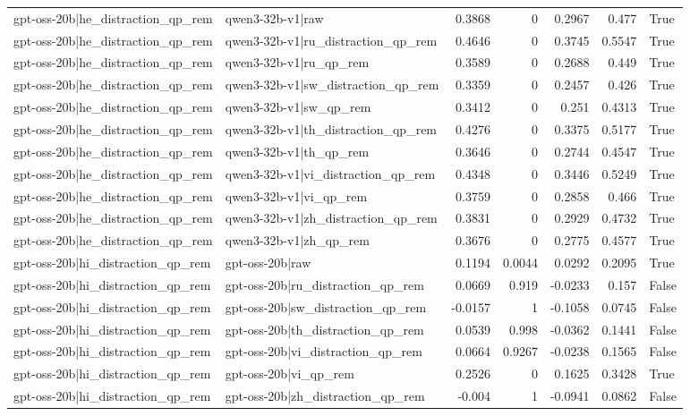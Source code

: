 \begin{table}
\begin{tabular}{l l r r r r l}
gpt-oss-20b|he_distraction_qp_rem & qwen3-32b-v1|raw & 0.3868 & 0 & 0.2967 & 0.477 & True \\
gpt-oss-20b|he_distraction_qp_rem & qwen3-32b-v1|ru_distraction_qp_rem & 0.4646 & 0 & 0.3745 & 0.5547 & True \\
gpt-oss-20b|he_distraction_qp_rem & qwen3-32b-v1|ru_qp_rem & 0.3589 & 0 & 0.2688 & 0.449 & True \\
gpt-oss-20b|he_distraction_qp_rem & qwen3-32b-v1|sw_distraction_qp_rem & 0.3359 & 0 & 0.2457 & 0.426 & True \\
gpt-oss-20b|he_distraction_qp_rem & qwen3-32b-v1|sw_qp_rem & 0.3412 & 0 & 0.251 & 0.4313 & True \\
gpt-oss-20b|he_distraction_qp_rem & qwen3-32b-v1|th_distraction_qp_rem & 0.4276 & 0 & 0.3375 & 0.5177 & True \\
gpt-oss-20b|he_distraction_qp_rem & qwen3-32b-v1|th_qp_rem & 0.3646 & 0 & 0.2744 & 0.4547 & True \\
gpt-oss-20b|he_distraction_qp_rem & qwen3-32b-v1|vi_distraction_qp_rem & 0.4348 & 0 & 0.3446 & 0.5249 & True \\
gpt-oss-20b|he_distraction_qp_rem & qwen3-32b-v1|vi_qp_rem & 0.3759 & 0 & 0.2858 & 0.466 & True \\
gpt-oss-20b|he_distraction_qp_rem & qwen3-32b-v1|zh_distraction_qp_rem & 0.3831 & 0 & 0.2929 & 0.4732 & True \\
gpt-oss-20b|he_distraction_qp_rem & qwen3-32b-v1|zh_qp_rem & 0.3676 & 0 & 0.2775 & 0.4577 & True \\
gpt-oss-20b|hi_distraction_qp_rem & gpt-oss-20b|raw & 0.1194 & 0.0044 & 0.0292 & 0.2095 & True \\
gpt-oss-20b|hi_distraction_qp_rem & gpt-oss-20b|ru_distraction_qp_rem & 0.0669 & 0.919 & -0.0233 & 0.157 & False \\
gpt-oss-20b|hi_distraction_qp_rem & gpt-oss-20b|sw_distraction_qp_rem & -0.0157 & 1 & -0.1058 & 0.0745 & False \\
gpt-oss-20b|hi_distraction_qp_rem & gpt-oss-20b|th_distraction_qp_rem & 0.0539 & 0.998 & -0.0362 & 0.1441 & False \\
gpt-oss-20b|hi_distraction_qp_rem & gpt-oss-20b|vi_distraction_qp_rem & 0.0664 & 0.9267 & -0.0238 & 0.1565 & False \\
gpt-oss-20b|hi_distraction_qp_rem & gpt-oss-20b|vi_qp_rem & 0.2526 & 0 & 0.1625 & 0.3428 & True \\
gpt-oss-20b|hi_distraction_qp_rem & gpt-oss-20b|zh_distraction_qp_rem & -0.004 & 1 & -0.0941 & 0.0862 & False \\

\end{tabular}
\end{table}
